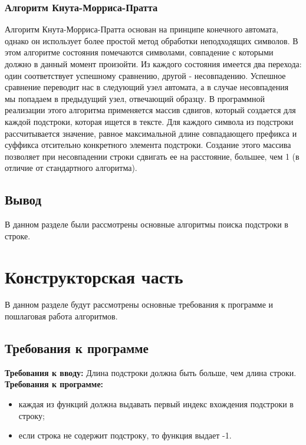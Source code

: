 \documentclass[12pt]{report}
\begin{document}
\subsection{Алгоритм Кнута-Морриса-Пратта}
Алгоритм Кнута-Морриса-Пратта основан на принципе конечного автомата, однако он использует более простой метод обработки неподходящих символов. В этом алгоритме состояния помечаются символами, совпадение с которыми должно в данный момент произойти. Из каждого состояния имеется два перехода: один соответствует успешному сравнению, другой - несовпадению. Успешное сравнение переводит нас в следующий узел автомата, а в случае несовпадения мы попадаем в предыдущий узел, отвечающий образцу. 
В программной реализации этого алгоритма применяется массив сдвигов, который создается для каждой подстроки, которая ищется в тексте. Для каждого символа из подстроки рассчитывается значение, равное максимальной длине совпадающего префикса и суффикса отсительно конкретного элемента подстроки. Создание этого массива позволяет при несовпадении строки сдвигать ее на расстояние, большее, чем 1 (в отличие от стандартного алгоритма).

\section*{Вывод}
В данном разделе были рассмотрены основные алгоритмы поиска подстроки в строке.



\chapter{Конструкторская часть}
В данном разделе будут рассмотрены основные требования к программе и пошлаговая работа алгоритмов.

\section{Требования к программе}

\textbf{Требования к вводу:}
Длина подстроки должна быть больше, чем длина строки.
\newline
\textbf{Требования к программе:}
\begin{itemize}
\item каждая из функций должна выдавать первый индекс вхождения подстроки в строку;
\item если строка не содержит подстроку, то функция выдает -1.
\end{itemize}
\end{document}
